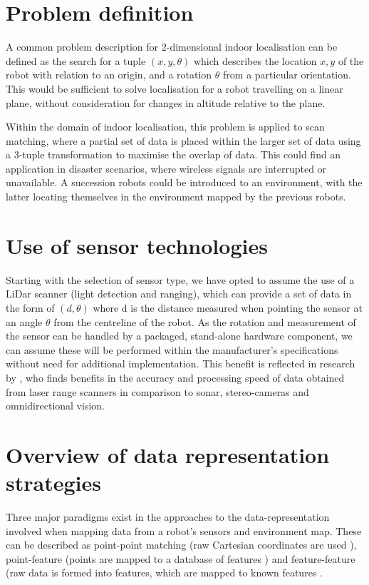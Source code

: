 \documentclass[authoryearcitations]{UoYCSproject}
\begin{document}
\section{Problem definition}
A common problem description for 2-dimensional indoor localisation can be defined as the search for a tuple $(x, y, \theta)$ which describes the location $x, y$ of the robot with relation to an origin, and a rotation $\theta$ from a particular orientation. This would be sufficient to solve localisation for a robot travelling on a linear plane, without consideration for changes in altitude relative to the plane.

Within the domain of indoor localisation, this problem is applied to scan matching, where a partial set of data is placed within the larger set of data using a 3-tuple transformation to maximise the overlap of data. This could find an application in disaster scenarios, where wireless signals are interrupted or unavailable. A succession robots could be introduced to an environment, with the latter locating themselves in the environment mapped by the previous robots.

\section{Use of sensor technologies}
Starting with the selection of sensor type, we have opted to assume the use of a LiDar scanner (light detection and ranging), which can provide a set of data in the form of $(d, \theta)$ where d is the distance measured when pointing the sensor at an angle $\theta$ from the centreline of the robot. As the rotation and measurement of the sensor can be handled by a packaged, stand-alone hardware component, we can assume these will be performed within the manufacturer's specifications without need for additional implementation. This benefit is reflected in research by \citet{Lingemann2005-hm}, who finds benefits in the accuracy and processing speed of data obtained from laser range scanners in comparison to sonar, stereo-cameras and omnidirectional vision.

\section{Overview of data representation strategies}
Three major paradigms exist in the approaches to the data-representation involved when mapping data from a robot's sensors and environment map. These can be described as point-point matching (raw Cartesian coordinates are used \cite{Lu1997-zv}), point-feature (points are mapped to a database of features \cite{Censi2008-ik}) and feature-feature (raw data is formed into features, which are mapped to known features \cite{Reina2000-vq}. 
\end{document}

